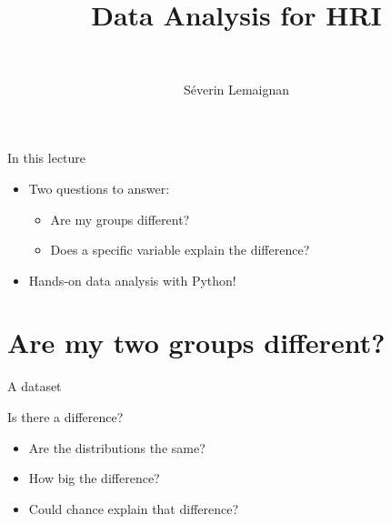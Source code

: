 \documentclass[compress]{beamer}
\title{Data Analysis for HRI}
\subtitle{~}
\date{}
\author{Séverin Lemaignan}
\institute{{\bf Bristol Robotics Lab}\\University of the West of England}
\makeatletter
\let\beamer@writeslidentry@miniframeson=\beamer@writeslidentry
\def\beamer@writeslidentry@miniframesoff{%
  \expandafter\beamer@ifempty\expandafter{\beamer@framestartpage}{}%
  {%
    \clearpage\beamer@notesactions%
  }
}
\newcommand*{\miniframeson}{\let\beamer@writeslidentry=\beamer@writeslidentry@miniframeson}
\newcommand*{\miniframesoff}{\let\beamer@writeslidentry=\beamer@writeslidentry@miniframesoff}
\makeatother
\begin{document}
\miniframesoff


\maketitle

\miniframeson


\begin{frame}{In this lecture}

\begin{itemize}
    \item<+-> Two questions to answer:
        \begin{itemize}
            \item<+-> Are my groups different?
            \item<+-> Does a specific variable explain the difference?
        \end{itemize}
    \item<+-> Hands-on data analysis with Python!
\end{itemize}

\end{frame}




\section{Are my two groups different?}

\begin{frame}{A dataset}

    \centering

\end{frame}


\begin{frame}{}

    Is there a difference?

    \begin{itemize}
        \item Are the distributions the same?
        \item How big the difference?
        \item Could chance explain that difference?
    \end{itemize}
\end{frame}
\end{document}
